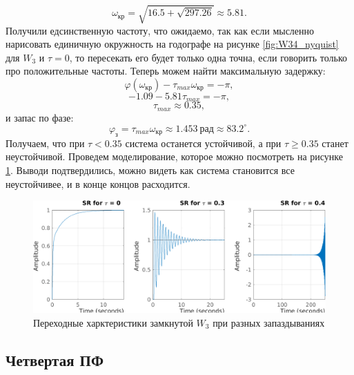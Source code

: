 \begin{equation*}
    \omega_\text{кр}=\sqrt{16.5+\sqrt{297.26}}\approx 5.81.
\end{equation*}
Получили едсинственную частоту, что ожидаемо, так как если мысленно нарисовать
единичную окружность на годографе на рисунке \ref{fig:W34_nyquist} для $W_3$ и $\tau=0$,
то пересекать его будет только одна точна, если говорить только про положительные частоты.
Теперь можем найти максимальную задержку:
\begin{equation*}
    \varphi(\omega_\text{кр}) - \tau_{max}\omega_\text{кр}=-\pi,
\end{equation*}
\begin{equation*}
    -1.09-5.81\tau_{max}=-\pi,
\end{equation*}
\begin{equation*}
    \tau_{max} \approx 0.35,
\end{equation*}
и запас по фазе:
\begin{equation*}
    \varphi_\text{з}=\tau_{max}\omega_\text{кр}\approx 1.453\ \text{рад}\approx 83.2^{\circ} .
\end{equation*}
Получаем, что при $\tau<0.35$ система останется устойчивой, а при $\tau\geq 0.35$ 
станет неустойчивой. Проведем моделирование, которое можно посмотреть на рисунке \ref{fig:W3_steps}.
Выводи подтвердились, можно видеть как система становится все неустойчивее, и в конце концов
расходится.


\begin{figure}[H]
    \centering
    \includegraphics[width=\textwidth]{figs/task_3_W3_tausteps.png}
    \caption{Переходные харктеристики замкнутой $W_3$ при разных запаздываниях}
    \label{fig:W3_steps}
\end{figure}

\subsection{Четвертая ПФ}

